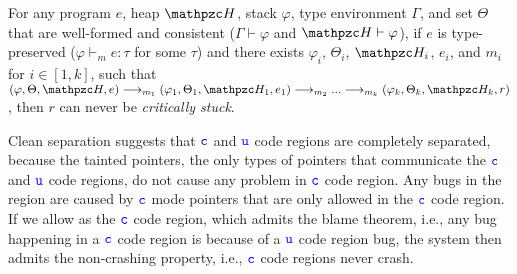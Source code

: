 \begin{thm}\label{thm:blame} For any \lang
  program $e$, heap $\heap$, stack
$\varphi$, type environment $\Gamma$, and set $\Theta$
that are well-formed and consistent
($\Gamma\vdash \varphi$ and $\heap \vdash \varphi$),
if $e$ is type-preserved ($\varphi\vdash_{m} e :
\tau$ for some $\tau$) and there exists
$\varphi_i$, $\Theta_i$, $\heap_i$, $e_i$, and $m_i$ for $i\in [1,k]$, such that
$(\varphi,\Theta,\heap,e) \longrightarrow_{m_1} (\varphi_1,\Theta_1,\heap_1,e_1)\longrightarrow_{m_2} ...\longrightarrow_{m_k} (\varphi_k,\Theta_k,\heap_k,r)$, then $r$ can never be \emph{critically stuck}.
\end{thm}

Clean separation suggests that $\textcolor{blue}{\texttt{c}}$ and $\textcolor{blue}{\texttt{u}}$ code regions are completely separated, because the tainted pointers, the only types of pointers that communicate the $\textcolor{blue}{\texttt{c}}$ and $\textcolor{blue}{\texttt{u}}$ code regions, do not cause any problem in $\textcolor{blue}{\texttt{c}}$ code region.
Any bugs in the region are caused by $\textcolor{blue}{\texttt{c}}$ mode pointers that are only allowed in the $\textcolor{blue}{\texttt{c}}$ code region.
If we allow \checkedc as the $\textcolor{blue}{\texttt{c}}$ code region, which admits the blame theorem, i.e., any bug happening in a $\textcolor{blue}{\texttt{c}}$ code region is because of a $\textcolor{blue}{\texttt{u}}$ code region bug, the system then admits the non-crashing property, i.e., $\textcolor{blue}{\texttt{c}}$ code regions never crash.


